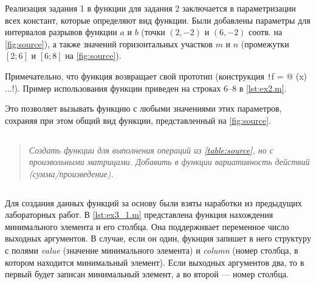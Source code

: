
Реализация задания 1 в функции для задания 2 заключается в параметризации всех констант, которые определяют вид функции.
Были добавлены параметры для интервалов разрывов функции $a$ и $b$ (точки $(2, -2)$ и $(6,-2)$ соотв. на \cref{fig:source}), а также значений горизонтальных участков $m$ и $n$ (промежутки $[2; 6]$ и $[6; 8]$ на \cref{fig:source}).

Примечательно, что функция возвращает свой прототип (конструкция \texttt!f = @ (x) ...!). Пример использования функции приведен на строках 6--8 в \cref{lst:ex2.m}. 

Это позволяет вызывать функцию с любыми значениями этих параметров, сохраняя при этом общий вид функции, представленный на \cref{fig:source}.


\subsection*{  }
\begin{quote}
    \textit{Создать функции для выполнения операций из \cref{table:source}, но с произвольными матрицами. Добавить в функции вариативность действий (сумма/произведение).}
\end{quote}


\begin{codemultipage}
    \inputminted{matlab}{code/ex3_2.m}
\end{codemultipage}

Для создания данных функций за основу были взяты наработки из предыдущих лабораторных работ.
В \cref{lst:ex3_1.m} представлена функция нахождения минимального элемента и его столбца. Она поддерживает переменное число выходных аргументов. В случае, если он один, фукнция запишет в него структуру с полями \textit{value} (значение минимального элемента) и \textit{column} (номер столбца, в котором находится минимальный элемент). Если выходных аргументов два, то в первый будет записан минимальный элемент, а во второй --- номер столбца.

